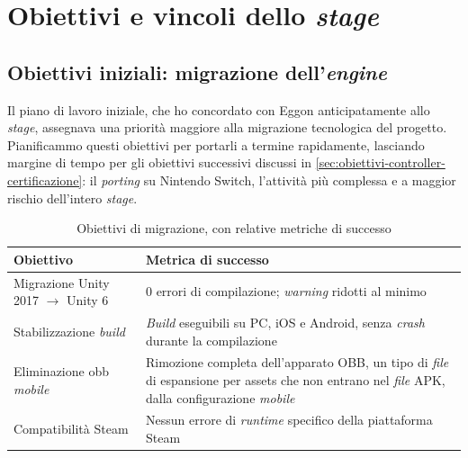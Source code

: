\section{Obiettivi e vincoli dello \textit{stage}}
\label{sec:obiettivi}


\subsection{Obiettivi iniziali: migrazione dell'\textit{engine}}
\label{sec:obiettivi-migrazione-engine}

Il piano di lavoro iniziale, che ho concordato con Eggon anticipatamente allo \textit{stage}, assegnava una priorità maggiore alla migrazione tecnologica del progetto.
Pianificammo questi obiettivi per portarli a termine rapidamente, lasciando margine di tempo per gli obiettivi successivi discussi in \ref{sec:obiettivi-controller-certificazione}: il \textit{porting} su Nintendo Switch, l'attività più complessa e a maggior rischio dell'intero \textit{stage}.

\begin{table}[h]
\centering
\begin{tabular}{|p{4.5cm}|p{6.5cm}|}
\hline
\textbf{Obiettivo} & \textbf{Metrica di successo} \\
\hline
Migrazione Unity 2017 $\rightarrow$ Unity 6 & 0 errori di compilazione; \textit{warning} ridotti al minimo \\
\hline
Stabilizzazione \textit{build} & \textit{Build} eseguibili su PC, iOS e Android, senza \textit{crash} durante la compilazione \\
\hline
Eliminazione \gls{obb} \textit{mobile} & Rimozione completa dell'apparato OBB, un tipo di \textit{file} di espansione per assets che non entrano nel \textit{file} APK, dalla configurazione \textit{mobile} \\
\hline
Compatibilità Steam & Nessun errore di \textit{runtime} specifico della piattaforma Steam \\
\hline
\end{tabular}
\caption{Obiettivi di migrazione, con relative metriche di successo}
\label{tab:obiettivi_migrazione}
\end{table}

